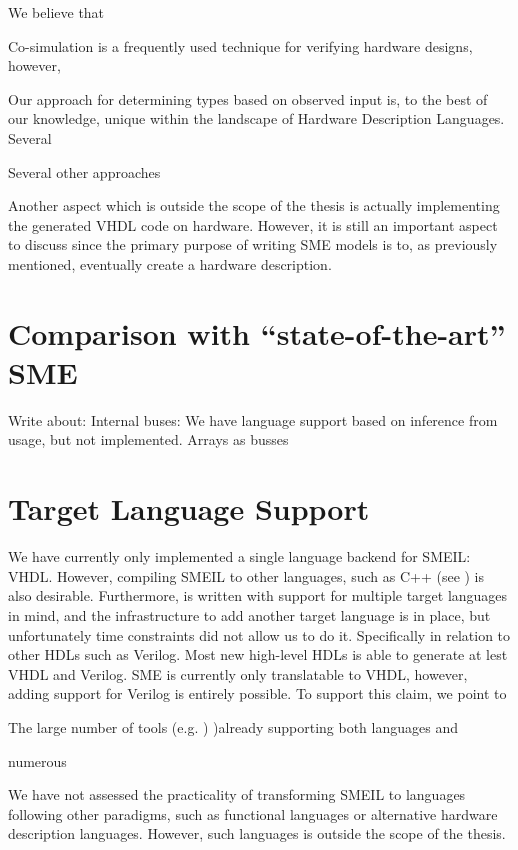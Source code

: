 We believe that

Co-simulation is a frequently used technique for verifying hardware designs,
however, 

Our approach for determining types based on observed input is, to the best of
our knowledge, unique within the landscape of Hardware Description
Languages. Several 

Several other approaches

Another aspect which is outside the scope of the thesis is actually implementing
the generated VHDL code on hardware. However, it is still an important aspect to
discuss since the primary purpose of writing SME models is to, as previously
mentioned, eventually create a hardware description. 



\section{Comparison with ``state-of-the-art'' SME}
Write about: Internal buses: We have language support based on inference from
usage, but not implemented. Arrays as busses



\section{Target Language Support}
We have currently only implemented a single language backend for SMEIL:
VHDL. However, compiling SMEIL to other languages, such as C++ (see
\cite{skovhede2017c++}) is also desirable. Furthermore, \libsme is written with
support for multiple target languages in mind, and the infrastructure to add
another target language is in place, but unfortunately time constraints did not
allow us to do it. Specifically in relation to other HDLs such as Verilog. Most
new high-level HDLs is able to generate at lest VHDL and Verilog. SME is
currently only translatable to VHDL, however, adding support for Verilog is
entirely possible. To support this claim, we point
to \begin{inparaenum}[a)]\item The large number of tools (e.g. )
  )already supporting both languages and \item numerous \end{inparaenum}   We have not assessed the
  practicality of transforming SMEIL to languages following other paradigms,
  such as functional languages or alternative hardware description
  languages. However, such languages is outside the scope of the thesis.

